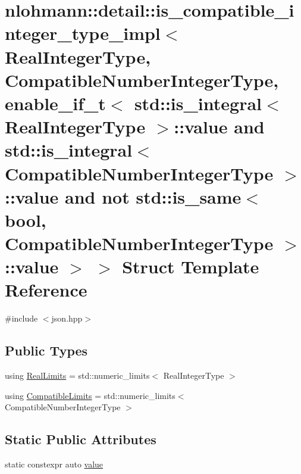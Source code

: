 \hypertarget{structnlohmann_1_1detail_1_1is__compatible__integer__type__impl_3_01_real_integer_type_00_01_com5aa74bcf254245a639da00509f4d2655}{}\section{nlohmann\+::detail\+::is\+\_\+compatible\+\_\+integer\+\_\+type\+\_\+impl$<$ Real\+Integer\+Type, Compatible\+Number\+Integer\+Type, enable\+\_\+if\+\_\+t$<$ std\+::is\+\_\+integral$<$ Real\+Integer\+Type $>$\+::value and std\+::is\+\_\+integral$<$ Compatible\+Number\+Integer\+Type $>$\+::value and not std\+::is\+\_\+same$<$ bool, Compatible\+Number\+Integer\+Type $>$\+::value $>$ $>$ Struct Template Reference}
\label{structnlohmann_1_1detail_1_1is__compatible__integer__type__impl_3_01_real_integer_type_00_01_com5aa74bcf254245a639da00509f4d2655}


{\ttfamily \#include $<$json.\+hpp$>$}

\subsection*{Public Types}
\begin{DoxyCompactItemize}
\item 
using \mbox{\hyperlink{structnlohmann_1_1detail_1_1is__compatible__integer__type__impl_3_01_real_integer_type_00_01_com5aa74bcf254245a639da00509f4d2655_a0e9f2586c4de25750563770c9388ab9f}{Real\+Limits}} = std\+::numeric\+\_\+limits$<$ Real\+Integer\+Type $>$
\item 
using \mbox{\hyperlink{structnlohmann_1_1detail_1_1is__compatible__integer__type__impl_3_01_real_integer_type_00_01_com5aa74bcf254245a639da00509f4d2655_a002983b5c7c0f72b89d2151a6b39627d}{Compatible\+Limits}} = std\+::numeric\+\_\+limits$<$ Compatible\+Number\+Integer\+Type $>$
\end{DoxyCompactItemize}
\subsection*{Static Public Attributes}
\begin{DoxyCompactItemize}
\item 
static constexpr auto \mbox{\hyperlink{structnlohmann_1_1detail_1_1is__compatible__integer__type__impl_3_01_real_integer_type_00_01_com5aa74bcf254245a639da00509f4d2655_a478242daac7a70e28c749bfec00d1c1b}{value}}
\end{DoxyCompactItemize}



